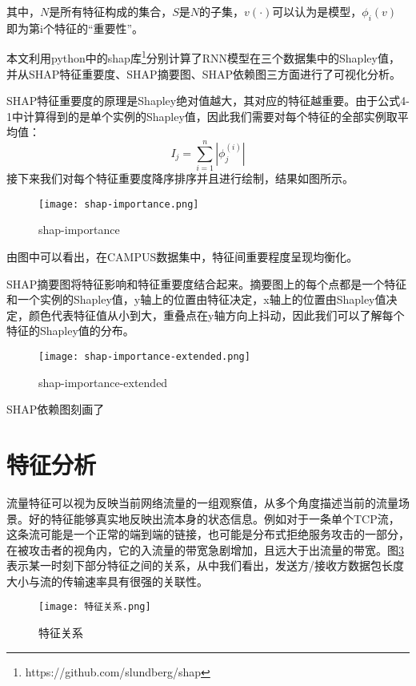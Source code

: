 其中，$N$是所有特征构成的集合，$S$是$N$的子集，$v(\cdot)$可以认为是模型，$\phi_i(v)$ 即为第i个特征的“重要性”。

本文利用python中的shap库\footnote{https://github.com/slundberg/shap}分别计算了RNN模型在三个数据集中的Shapley值，并从SHAP特征重要度、SHAP摘要图、SHAP依赖图三方面进行了可视化分析。

SHAP特征重要度的原理是Shapley绝对值越大，其对应的特征越重要。由于公式4-1中计算得到的是单个实例的Shapley值，因此我们需要对每个特征的全部实例取平均值：
\begin{equation}
  I_j = \sum_{i=1}^n |\phi_j^{(i)}|
\end{equation}
接下来我们对每个特征重要度降序排序并且进行绘制，结果如图所示。

\begin{figure}
  \centering
  \texttt{[image: shap-importance.png]}
  \caption{shap-importance}
  \label{fig:shap-importance}
\end{figure}

由图中可以看出，在CAMPUS数据集中，特征间重要程度呈现均衡化。

SHAP摘要图将特征影响和特征重要度结合起来。摘要图上的每个点都是一个特征和一个实例的Shapley值，y轴上的位置由特征决定，x轴上的位置由Shapley值决定，颜色代表特征值从小到大，重叠点在y轴方向上抖动，因此我们可以了解每个特征的Shapley值的分布。

\begin{figure}
  \centering
  \texttt{[image: shap-importance-extended.png]}
  \caption{shap-importance-extended}
  \label{fig:shap-importance-extended}
\end{figure}

SHAP依赖图刻画了
\section{特征分析}
流量特征可以视为反映当前网络流量的一组观察值，从多个角度描述当前的流量场景。好的特征能够真实地反映出流本身的状态信息。例如对于一条单个TCP流，这条流可能是一个正常的端到端的链接，也可能是分布式拒绝服务攻击的一部分，在被攻击者的视角内，它的入流量的带宽急剧增加，且远大于出流量的带宽。图\ref{fig:特征关系}表示某一时刻下部分特征之间的关系，从中我们看出，发送方/接收方数据包长度大小与流的传输速率具有很强的关联性。

\begin{figure}
  \centering
  \texttt{[image: 特征关系.png]}
  \caption{特征关系}
  \label{fig:特征关系}
\end{figure}

